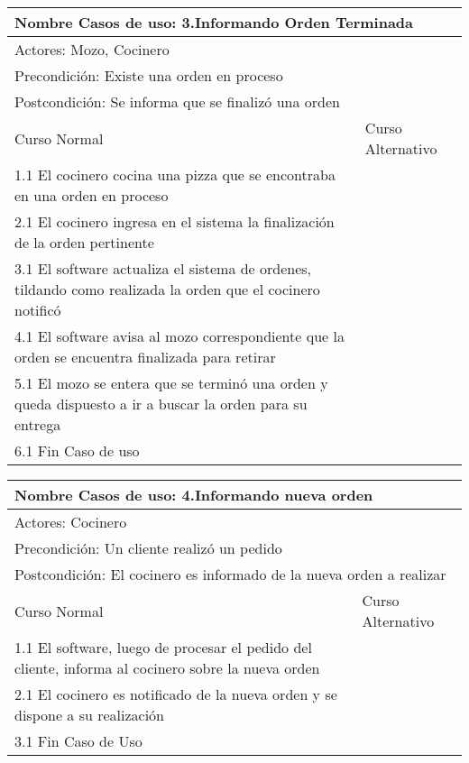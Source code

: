 \documentclass[a4paper,10pt]{article}
\begin{document}
\begin{center}
\begin{tabularx}{14cm}{|X|X|}
\hline
\multicolumn{2}{|l|}{Nombre Casos de uso: 3.Informando Orden Terminada}\\
\hline
\multicolumn{2}{|l|}{Actores: Mozo, Cocinero}\\
\hline
\multicolumn{2}{|l|}{Precondici\'on: Existe una orden en proceso}\\
\hline
\multicolumn{2}{|l|}{Postcondici\'on: Se informa que se finaliz\'o una orden}\\
\hline
Curso Normal & Curso Alternativo\\
\hline
1.1 El cocinero cocina una pizza que se encontraba en una orden en proceso & 
\\
\hline
2.1 El cocinero ingresa en el sistema la finalizaci\'on de la orden pertinente & 
\\
\hline
3.1 El software actualiza el sistema de ordenes, tildando como realizada la orden que el cocinero notific\'o &
\\
\hline
4.1 El software avisa al mozo correspondiente que la orden se encuentra finalizada para retirar &
\\
\hline
5.1 El mozo se entera que se termin\'o una orden y queda dispuesto a ir a buscar la orden para su entrega &
\\
\hline
6.1 Fin Caso de uso &
\\
\hline
\end{tabularx}
\end{center}

\bigskip

\begin{center}
\begin{tabularx}{14cm}{|X|X|}
\hline
\multicolumn{2}{|l|}{Nombre Casos de uso: 4.Informando nueva orden}\\
\hline
\multicolumn{2}{|l|}{Actores: Cocinero}\\
\hline
\multicolumn{2}{|l|}{Precondici\'on: Un cliente realiz\'o un pedido}\\
\hline
\multicolumn{2}{|l|}{Postcondici\'on: El cocinero es informado de la nueva orden a realizar}\\
\hline
Curso Normal & Curso Alternativo\\
\hline
1.1 El software, luego de procesar el pedido del cliente, informa al cocinero sobre la nueva orden & 
\\
\hline
2.1 El cocinero es notificado de la nueva orden y se dispone a su realizaci\'on & 
\\
\hline
3.1 Fin Caso de Uso
\\
\hline
\end{tabularx}
\end{center}
\end{document}
